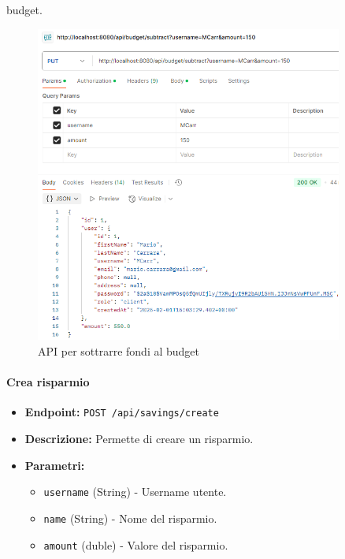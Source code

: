\begin{itemize}
\begin{itemize}
budget.
    \end{itemize}
\end{itemize}

\begin{figure}[H]
    \centering
    \includegraphics[width=0.9\textwidth]{images/SubtractBudgetAPI.png}
    \caption{API per sottrarre fondi al budget}
    \label{fig:SubtractBudgetAPI}
\end{figure}

\paragraph{Crea risparmio} 

\begin{itemize}
    \item \textbf{Endpoint:} \texttt{POST /api/savings/create}
    \item \textbf{Descrizione:} Permette di creare un risparmio.
    \item \textbf{Parametri:}
    \begin{itemize}
        \item \texttt{username} (String) - Username utente.
        \item \texttt{name} (String) - Nome del risparmio.
        \item \texttt{amount} (duble) - Valore del risparmio.
    \end{itemize}
\end{itemize}

